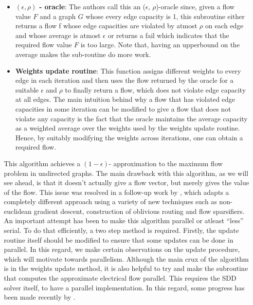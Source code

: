 \documentclass[BTech]{iitmdiss}
\begin{document}
	 \begin{itemize}
	  \item 
	    \textbf{$(\epsilon, \rho)$ - oracle}: The authors call this an ($\epsilon$, $\rho$)-oracle since, given a flow value $F$ and a graph $G$ whose every
	    edge capacity is 1, this subroutine either returns a flow f whose edge capacities are violated by atmost $\rho$ on each edge 
	    and whose average is atmost $\epsilon$ or returns a fail which indicates that the required flow value $F$ is too large. Note that, 
	    having an upperbound on the average makes the sub-routine do more work.
	  \item
	    \textbf{Weights update routine}: This function assigns different weights to every edge in each iteration and then uses the flow returned 
	    by the oracle for a suitable $\epsilon$ and $\rho$ to finally return a flow, which does not violate edge capacity at all edges. The main 
	    intuition behind why a flow that has violated edge capacities in some iteration can be modified to give a flow that does not violate 
	    any capacity is the fact that the oracle maintains the average capacity as a weighted average over the weights used by the weights
	    update routine. Hence, by suitably modifying the weights across iterations, one can obtain a required flow.
	 \end{itemize}

	  This algorithm achieves a $(1- \epsilon)$- approximation to the maximum flow problem in undirected graphs. The main drawback with this algorithm,
	  as we will see ahead, is that it doesn't actually give a flow vector, but merely gives the value of the flow. This issue was resolved 
	  in a follow-up work by \cite{DBLP:journals/corr/abs-1304-2338}, which adapts a completely different approach using a variety of new techniques
	  such as non-euclidean gradient descent, construction of oblivious routing and flow sparsifiers. \\
	  
	  An important attempt has been to make this algorithm parallel or atleast ``less'' serial. To do that efficiently, a two step method is 
	  required. Firstly, the update routine itself should be modified to ensure that some updates can be done in parallel. In this regard, we make
	  certain observations on the update procedure, which will motivate towards parallelism.
	  Although the main crux of the algorithm is in the weights update method, it is also helpful to try and make the subroutine that computes the
	  approximate electrical flow parallel. This requires the SDD solver itself, to have a parallel implementation. In this regard, some progress has
	  been made recently by \cite{DBLP:journals/corr/PengS13}. \\
	
\end{document}
